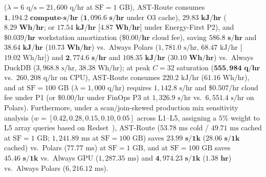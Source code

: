 \documentclass[10pt,a4paper]{article}
\begin{document}
\begin{enumerate}[leftmargin=1.5em,itemsep=0.8pt]
($\lambda=6\text{ q/s} = 21{,}600\text{ q/hr}$ at $\text{SF}=1\text{ GB}$), AST-Route consumes $\mathbf{1{,}194.2\text{ compute-s/hr}}$ ($\mathbf{1{,}096.6\text{ s/hr}}$ under O3 cache), $\mathbf{29.83\text{ kJ/hr}}$ ($\mathbf{8.29\text{ Wh/hr}}$; or $\mathbf{17.54\text{ kJ/hr}}$ [$\mathbf{4.87\text{ Wh/hr}}$] under Energy-First P2), and $\mathbf{\$0.039\text{/hr}}$ workstation amortization ($\mathbf{\$0.00\text{/hr}}$ cloud fee), saving $\mathbf{586.8\text{ s/hr}}$ and $\mathbf{38.64\text{ kJ/hr}}$ ($\mathbf{10.73\text{ Wh/hr}}$) vs.\ Always Polars ($1{,}781.0\text{ s/hr}$, $68.47\text{ kJ/hr}$ [$19.02\text{ Wh/hr}$]) and $\mathbf{2{,}774.6\text{ s/hr}}$ and $\mathbf{108.35\text{ kJ/hr}}$ ($\mathbf{30.10\text{ Wh/hr}}$) vs.\ Always DuckDB ($3{,}968.8\text{ s/hr}$, $38.38\text{ Wh/hr}$); at peak $C=32$ saturation ($\mathbf{555{,}984\text{ q/hr}}$ vs.\ $260{,}208\text{ q/hr}$ on CPU), AST-Route consumes $220.2\text{ kJ/hr}$ ($61.16\text{ Wh/hr}$), and at $\text{SF}=100\text{ GB}$ ($\lambda=1{,}000\text{ q/hr}$) requires $1{,}142.8\text{ s/hr}$ and $\$0.507\text{/hr}$ cloud fee under P1 (or $\$0.00\text{/hr}$ under FinOps P3 at $1{,}326.9\text{ s/hr}$ vs.\ $6{,}551.4\text{ s/hr}$ on Polars). Furthermore, under a scan/join-skewed production mix sensitivity analysis ($w = [0.42, 0.28, 0.15, 0.10, 0.05]$ across L1--L5, assigning a $5\%$ weight to L5 array queries based on Redset~\cite{vanrenen2024redset}), AST-Route ($53.78\text{ ms}$ cold / $49.71\text{ ms}$ cached at $\text{SF}=1\text{ GB}$; $1{,}241.89\text{ ms}$ at $\text{SF}=100\text{ GB}$) saves $\mathbf{23.99\text{ s}/1\text{k}}$ ($\mathbf{28.06\text{ s}/1\text{k}}$ cached) vs.\ Polars ($77.77\text{ ms}$) at $\text{SF}=1\text{ GB}$, and at $\text{SF}=100\text{ GB}$ saves $\mathbf{45.46\text{ s}/1\text{k}}$ vs.\ Always GPU ($1{,}287.35\text{ ms}$) and $\mathbf{4{,}974.23\text{ s}/1\text{k}}$ ($\mathbf{1.38\text{ hr}}$) vs.\ Always Polars ($6{,}216.12\text{ ms}$).

\end{enumerate}
\end{document}
